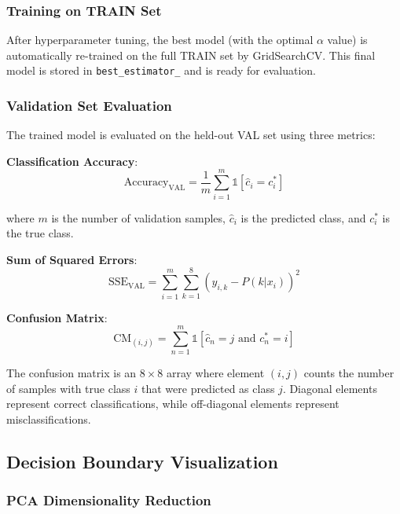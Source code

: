 \documentclass[12pt]{article}
\begin{document}
\subsubsection{Training on TRAIN Set}

After hyperparameter tuning, the best model (with the optimal $\alpha$ value) is automatically re-trained on the full TRAIN set by GridSearchCV. This final model is stored in \texttt{best\_estimator\_} and is ready for evaluation.

\subsubsection{Validation Set Evaluation}

The trained model is evaluated on the held-out VAL set using three metrics:

\textbf{Classification Accuracy}:
\begin{equation}
\text{Accuracy}_{\text{VAL}} = \frac{1}{m} \sum_{i=1}^{m} \mathbb{1}[\hat{c}_i = c_i^*]
\end{equation}

where $m$ is the number of validation samples, $\hat{c}_i$ is the predicted class, and $c_i^*$ is the true class.

\textbf{Sum of Squared Errors}:
\begin{equation}
\text{SSE}_{\text{VAL}} = \sum_{i=1}^{m} \sum_{k=1}^{8} (y_{i,k} - P(k|x_i))^2
\end{equation}

\textbf{Confusion Matrix}:
\begin{equation}
\text{CM}_{(i,j)} = \sum_{n=1}^{m} \mathbb{1}[\hat{c}_n = j \text{ and } c_n^* = i]
\end{equation}

The confusion matrix is an $8 \times 8$ array where element $(i, j)$ counts the number of samples with true class $i$ that were predicted as class $j$. Diagonal elements represent correct classifications, while off-diagonal elements represent misclassifications.

\subsection{Decision Boundary Visualization}

\subsubsection{PCA Dimensionality Reduction}
\end{document}

